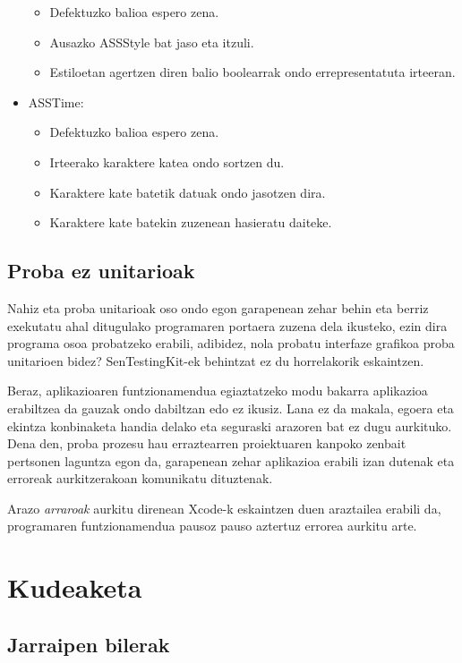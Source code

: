 \begin{itemize}
\begin{itemize}
		\item Defektuzko balioa espero zena.
		\item Ausazko ASSStyle bat jaso eta itzuli.
		\item Estiloetan agertzen diren balio boolearrak ondo errepresentatuta irteeran. 
	\end{itemize}
	\item ASSTime: \begin{itemize}
		\item Defektuzko balioa espero zena.
		\item Irteerako karaktere katea ondo sortzen du.
		\item Karaktere kate batetik datuak ondo jasotzen dira.
		\item Karaktere kate batekin zuzenean hasieratu daiteke.
	\end{itemize}
\end{itemize}

\subsection{Proba ez unitarioak}
Nahiz eta proba unitarioak oso ondo egon garapenean zehar behin eta berriz exekutatu ahal ditugulako programaren portaera zuzena dela ikusteko, ezin dira programa osoa probatzeko erabili, adibidez, nola probatu interfaze grafikoa proba unitarioen bidez? SenTestingKit-ek behintzat ez du horrelakorik eskaintzen.

Beraz, aplikazioaren funtzionamendua egiaztatzeko modu bakarra aplikazioa erabiltzea da gauzak ondo dabiltzan edo ez ikusiz. Lana ez da makala, egoera eta ekintza konbinaketa handia delako eta seguraski arazoren bat ez dugu aurkituko. Dena den, proba prozesu hau erraztearren proiektuaren kanpoko zenbait pertsonen laguntza egon da, garapenean zehar aplikazioa erabili izan dutenak eta erroreak aurkitzerakoan komunikatu dituztenak.

Arazo \textit{arraroak} aurkitu direnean Xcode-k eskaintzen duen araztailea erabili da, programaren funtzionamendua pausoz pauso aztertuz errorea aurkitu arte.

\section{Kudeaketa}

\subsection{Jarraipen bilerak}

